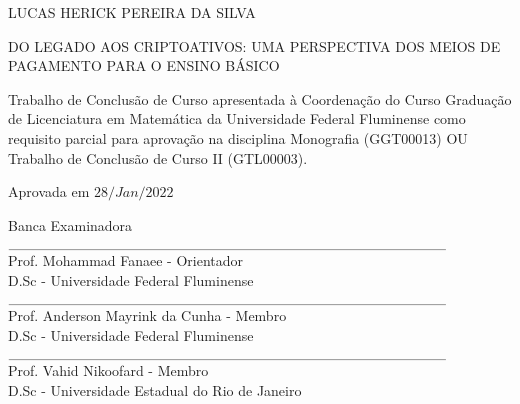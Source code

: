 

\begin{center}
	
	LUCAS HERICK PEREIRA DA SILVA	
	
	\vspace{1cm}
	
\uppercase{Do legado aos criptoativos: uma perspectiva dos meios de pagamento para o ensino básico} 
	\vspace{1.0cm}
	
	\begin{flushright}
		\begin{minipage}{7.75 cm}
			\nohyphens{
			Trabalho de Conclusão de Curso apresentada à Coordenação do Curso Graduação de Licenciatura em Matemática da Universidade Federal Fluminense como requisito parcial para aprovação na disciplina Monografia (GGT00013) OU Trabalho de Conclusão de Curso II (GTL00003).
		}
			
		\end{minipage}
	\end{flushright}

\vspace{1cm}

\begin{flushleft}
	Aprovada em
	 $28\slash Jan \slash 2022$
\end{flushleft}	

\vspace{1cm}

Banca Examinadora 

\vspace{1.5cm}

\begin{flushleft}
		$\rule{11cm}{0.1mm}$\\
	Prof. Mohammad Fanaee - Orientador\\
	D.Sc - Universidade Federal Fluminense\\
	
	\vspace{1cm}
	
		$\rule{11cm}{0.1mm}$\\
	Prof. Anderson Mayrink da Cunha - Membro\\
	D.Sc - Universidade Federal Fluminense\\
	
	\vspace{1cm}
	
		$\rule{11cm}{0.1mm}$\\
	Prof. Vahid Nikoofard - Membro\\
	D.Sc - Universidade Estadual do Rio de Janeiro\\
\end{flushleft}
	
	
	\vfill
	
\end{center}
